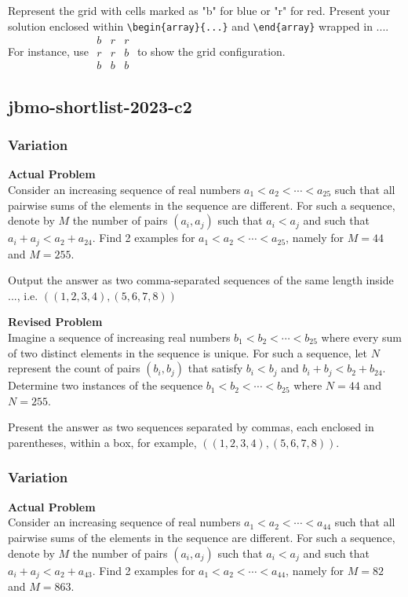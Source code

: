 Represent the grid with cells marked as "b" for blue or "r" for red. Present your solution enclosed within \verb|\begin{array}{...}| and \verb|\end{array}| wrapped in $\boxed{...}$. For instance, use $\boxed{\begin{array}{ccc}b & r & r \\ r & r & b \\ b & b & b\end{array}}$ to show the grid configuration.

\subsection{jbmo-shortlist-2023-c2}
\subsubsection{Variation}
\textbf{Actual Problem}\\
Consider an increasing sequence of real numbers $a_1 < a_2 < \cdots < a_{25}$ such that all pairwise sums of the elements in the sequence are different. For such a sequence, denote by $M$ the number of pairs $(a_i, a_j)$ such that $a_i < a_j$ and such that $a_i+a_j < a_2+a_{24}$. Find 2 examples for $a_1 < a_2 < \cdots < a_{25}$, namely for $M=44$ and $M=255$. 

Output the answer as two comma-separated sequences of the same length inside $\boxed{...}$, i.e. $\boxed{((1, 2, 3, 4), (5, 6, 7, 8))}$

\textbf{Revised Problem}\\
Imagine a sequence of increasing real numbers $b_1 < b_2 < \cdots < b_{25}$ where every sum of two distinct elements in the sequence is unique. For such a sequence, let $N$ represent the count of pairs $(b_i, b_j)$ that satisfy $b_i < b_j$ and $b_i+b_j < b_2+b_{24}$. Determine two instances of the sequence $b_1 < b_2 < \cdots < b_{25}$ where $N=44$ and $N=255$.

Present the answer as two sequences separated by commas, each enclosed in parentheses, within a box, for example, $\boxed{((1, 2, 3, 4), (5, 6, 7, 8))}$.

\subsubsection{Variation}
\textbf{Actual Problem}\\
Consider an increasing sequence of real numbers $a_1 < a_2 < \cdots < a_{44}$ such that all pairwise sums of the elements in the sequence are different. For such a sequence, denote by $M$ the number of pairs $(a_i, a_j)$ such that $a_i < a_j$ and such that $a_i+a_j < a_2+a_{43}$. Find 2 examples for $a_1 < a_2 < \cdots < a_{44}$, namely for $M=82$ and $M=863$. 

